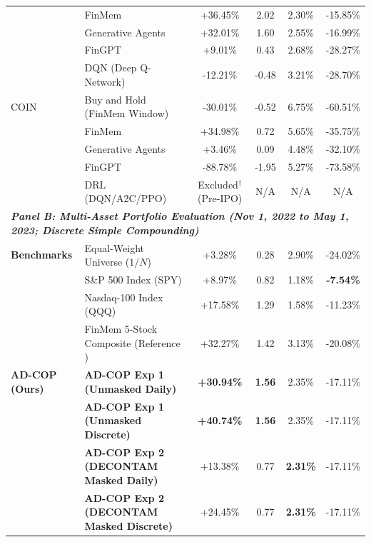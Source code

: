 \documentclass[conference]{IEEEtran}
\begin{document}
\begin{table}[t]
\begin{tabular}{llcccc}
     & FinMem \cite{yu2023finmem} & +36.45\% & 2.02 & 2.30\% & -15.85\% \\
     & Generative Agents \cite{park2023generative} & +32.01\% & 1.60 & 2.55\% & -16.99\% \\
     & FinGPT \cite{yang2023fingpt} & +9.01\% & 0.43 & 2.68\% & -28.27\% \\
     & DQN (Deep Q-Network) \cite{yu2023finmem} & -12.21\% & -0.48 & 3.21\% & -28.70\% \\
\midrule
COIN & Buy and Hold (FinMem Window) & -30.01\% & -0.52 & 6.75\% & -60.51\% \\
     & FinMem \cite{yu2023finmem} & +34.98\% & 0.72 & 5.65\% & -35.75\% \\
     & Generative Agents \cite{park2023generative} & +3.46\% & 0.09 & 4.48\% & -32.10\% \\
     & FinGPT \cite{yang2023fingpt} & -88.78\% & -1.95 & 5.27\% & -73.58\% \\
     & DRL (DQN/A2C/PPO) & Excluded$^\dagger$ (Pre-IPO) & N/A & N/A & N/A \\
\midrule
\multicolumn{6}{l}{\textit{\textbf{Panel B: Multi-Asset Portfolio Evaluation (Nov 1, 2022 to May 1, 2023; Discrete Simple Compounding)}}} \\
\midrule
\textbf{Benchmarks} & Equal-Weight Universe ($1/N$) & +3.28\% & 0.28 & 2.90\% & -24.02\% \\
     & S\&P 500 Index (SPY) & +8.97\% & 0.82 & 1.18\% & \textbf{-7.54\%} \\
     & Nasdaq-100 Index (QQQ) & +17.58\% & 1.29 & 1.58\% & -11.23\% \\
     & FinMem 5-Stock Composite (Reference \cite{yu2023finmem}) & +32.27\% & 1.42 & 3.13\% & -20.08\% \\
\midrule
\textbf{AD-COP (Ours)} & \textbf{AD-COP Exp 1 (Unmasked Daily)} & \textbf{+30.94\%} & \textbf{1.56} & 2.35\% & -17.11\% \\
     & \textbf{AD-COP Exp 1 (Unmasked Discrete)} & \textbf{+40.74\%} & \textbf{1.56} & 2.35\% & -17.11\% \\
     & \textbf{AD-COP Exp 2 (DECONTAM Masked Daily)} & +13.38\% & 0.77 & \textbf{2.31\%} & -17.11\% \\
     & \textbf{AD-COP Exp 2 (DECONTAM Masked Discrete)} & +24.45\% & 0.77 & \textbf{2.31\%} & -17.11\% \\
\bottomrule

\end{tabular}
\end{table}
\end{document}
